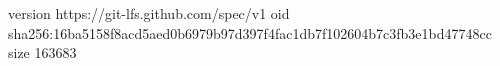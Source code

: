 version https://git-lfs.github.com/spec/v1
oid sha256:16ba5158f8acd5aed0b6979b97d397f4fac1db7f102604b7c3fb3e1bd47748cc
size 163683
